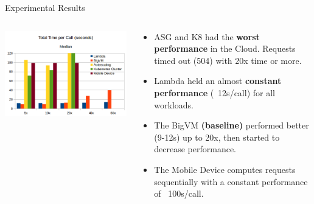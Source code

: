 \documentclass[pdf,10pt]{beamer}
\begin{document}
\begin{frame}{Experimental Results}
    \begin{columns}[T]
        \begin{column}{0.57\textwidth}
            \vskip1.4cm
            \includegraphics[width=\textwidth]{img/1.png}
        \end{column}
        \begin{column}{0.5\textwidth}
            \begin{itemize}
                \item ASG and K8 had the \textbf{worst performance} in the Cloud. Requests timed out (504) with 20x time or more.
\item Lambda held an almost \textbf{constant performance} (~12s/call) for all workloads.
\item The BigVM \textbf{(baseline)} performed better (9-12s) up to 20x, then started to decrease performance.
\item The Mobile Device computes requests sequentially with a constant performance of ~100s/call. 
            \end{itemize}
        \end{column}
    \end{columns}
\end{frame}
\end{document}
